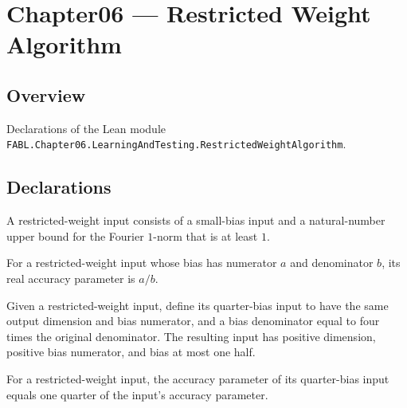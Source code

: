 \chapter{Chapter06 — Restricted Weight Algorithm}
\section{Overview}

Declarations of the Lean module \texttt{FABL.Chapter06.LearningAndTesting.RestrictedWeightAlgorithm}.

\section{Declarations}

\begin{definition}
\label{FABL.RestrictedWeightInput}
\leanok
{}
A restricted-weight input consists of a small-bias input and a natural-number upper
bound for the Fourier $1$-norm that is at least $1$.
\end{definition}

\begin{definition}
\label{FABL.RestrictedWeightInput.epsilon}
\leanok
{}
For a restricted-weight input whose bias has numerator $a$ and denominator $b$, its real
accuracy parameter is $a/b$.
\end{definition}

\begin{definition}
\label{FABL.RestrictedWeightInput.quarterBias}
\leanok
{}
Given a restricted-weight input, define its quarter-bias input to have the same output
dimension and bias numerator, and a bias denominator equal to four times the original
denominator. The resulting input has positive dimension, positive bias numerator, and
bias at most one half.
\end{definition}

\begin{theorem}
\label{FABL.RestrictedWeightInput.quarterBias_epsilon}
\leanok
{}
For a restricted-weight input, the accuracy parameter of its quarter-bias input equals
one quarter of the input's accuracy parameter.
\end{theorem}

